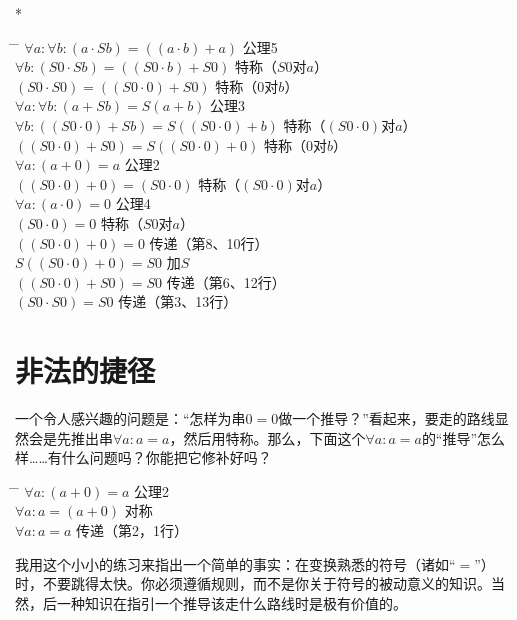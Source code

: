 \begin{center}
* \quad * \quad * \quad * \quad *
\end{center}

\begin{tabbing*}
\qquad\qquad \= \tabindent{-2em} \= \+\kill
$\forall a:\forall b:(a\cdot Sb)=((a\cdot b)+a)$ \>公理5\\
$\forall b:(S0\cdot Sb)=((S0\cdot b)+S0)$        \>特称（$S0$对$a$）\\
$(S0\cdot S0)=((S0\cdot 0)+S0)$                  \>特称（$0$对$b$）\\
$\forall a:\forall b:(a+Sb)=S(a+b)$              \>公理3\\
$\forall b:((S0\cdot 0)+Sb)=S((S0\cdot 0)+b)$    \>特称（$(S0\cdot 0)$对$a$）\\
$((S0\cdot 0)+S0)=S((S0\cdot 0)+0)$              \>特称（$0$对$b$）\\
$\forall a:(a+0)=a$                              \>公理2\\
$((S0\cdot 0)+0)=(S0\cdot 0)$                    \>特称（$(S0\cdot 0)$对$a$）\\
$\forall a:(a\cdot 0)=0$                         \>公理4\\
$(S0\cdot 0)=0$                                  \>特称（$S0$对$a$）\\
$((S0\cdot 0)+0)=0$                              \>传递（第8、10行）\\
$S((S0\cdot 0)+0)=S0$                            \>加$S$\\
$((S0\cdot 0)+S0)=S0$                            \>传递（第6、12行）\\
$(S0\cdot S0)=S0$                                \>传递（第3、13行）
\end{tabbing*}

\section{非法的捷径}

一个令人感兴趣的问题是：“怎样为串$0=0$做一个推导？”看起来，要走的路线显然会是先推出串$\forall a:a=a$，然后用特称。那么，下面这个$\forall a:a=a$的“推导”怎么样……有什么问题吗？你能把它修补好吗？

\begin{tabbing*}
\qquad\qquad \= \tabindent{-2em} \= \+\kill
$\forall a:(a+0)=a$ \>公理2\\
$\forall a:a=(a+0)$ \>对称\\
$\forall a:a=a$     \>传递（第2，1行）
\end{tabbing*}
我用这个小小的练习来指出一个简单的事实：在变换熟悉的符号（诸如“$=$”）时，不要跳得太快。你必须遵循规则，而不是你关于符号的被动意义的知识。当然，后一种知识在指引一个推导该走什么路线时是极有价值的。

